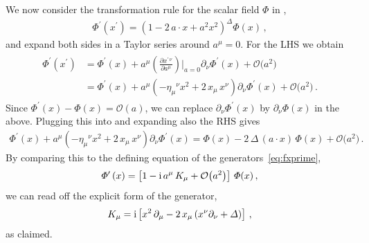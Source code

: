 \noindent
We now consider the transformation rule for the scalar field $\Phi$ in ,
\begin{align} \label{eq:conformal_scalar_2}
\Phi^{\prime}(x^{\prime}) =  \left(1 - 2 \, a \cdot x + a^2 x^2\right)^{\Delta} \Phi(x) \,,
\end{align}
and expand both sides in a Taylor series around $a^{\mu} = 0$. For the LHS we obtain
\begin{align} \label{eq:fprimeTaylor} \begin{aligned}
\Phi^{\prime}\left( x^{\prime} \right) & = \Phi^{\prime}(x) + a^{\mu} \left( \frac{\partial x^{\prime \, \nu}}{\partial a^{\mu}} \right) \biggl|_{a=0} \partial_{\nu} \Phi^{\prime}(x) + \mathcal{O}\bigl(a^2\bigr) \\
& = \Phi^{\prime}(x) + a^{\mu} \left( - \eta_{\mu}{}^{\nu} x^2 + 2 \, x_{\mu} \, x^{\nu} \right) \partial_{\nu} \Phi^{\prime}(x) + \mathcal{O}\bigl(a^2\bigr) \,.
\end{aligned} \end{align}
Since $\Phi^{\prime}(x) - \Phi(x) = \mathcal{O}(a)$, we can replace $\partial_{\nu} \Phi^{\prime}(x) $ by $\partial_{\nu} \Phi(x) $ in the above. Plugging this into  and expanding also the RHS gives
\begin{align}
 \Phi^{\prime}(x) + a^{\mu} \left( - \eta_{\mu}{}^{\nu} x^2 + 2 \, x_{\mu} \, x^{\nu} \right) \partial_{\nu} \Phi^{\prime}(x)  = \Phi(x) - 2 \, \Delta \, (a \cdot x) \, \Phi(x) + \mathcal{O}\bigl(a^2\bigr) \,.
\end{align}
By comparing this to the defining equation of the generators~\eqref{eq:fxprime},
\begin{align}
\Phi^{\prime}\left( x \right ) = \left[ 1 - \i \, a^{\mu} \, K_{\mu} +  \mathcal{O}\bigl(a^2\bigr) \right] \, \Phi(x) \,,
\end{align}
we can read off the explicit form of the generator,
\begin{align}
K_{\mu} = \i \left[ x^2 \, \partial_{\mu} - 2 \, x_{\mu} \left( x^{\nu} \partial_{\nu} + \Delta \right) \right] \,,
\end{align}
as claimed.






